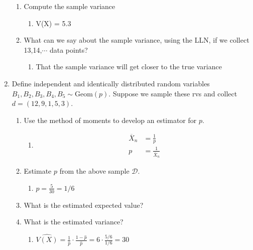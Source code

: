 \documentclass[krantz1,ChapterTOCs]{krantz}
\begin{document}
\begin{enumerate}
\begin{enumerate}
        \item Compute the sample variance
        \begin{enumerate}
            \item { \color{red} V(X) = 5.3  } 
        \end{enumerate}
 
        \item What can we say about the sample variance, using the LLN, if we collect 13,14,$\cdots$ data points?
        \begin{enumerate}
            \item { \color{red} That the sample variance will get closer to the true variance } 
        \end{enumerate}
    \end{enumerate}
    
    \item Define independent and identically distributed random variables $B_{1},B_{2},B_{3},B_{4},B_{5} \sim \text{Geom}(p)$. Suppose we sample these rvs and collect $d = (12,9,1,5,3)$.
    \begin{enumerate}
        \item Use the method of moments to develop an estimator for $p$.
        \begin{enumerate}
            \item { \color{red} 
            \begin{align}
              \overline{X}_{n}  &= \frac{1}{p} \\
              p &= \frac{1}{\overline{X}_{n}} 
            \end{align}
             } 
        \end{enumerate}
        
        \item Estimate $p$ from the above sample $\mathcal{D}$.
        \begin{enumerate}
            \item {\color{red} $p = \frac{5}{30} = 1/6 $  }
        \end{enumerate}
        
        \item What is the estimated expected value? 
        \begin{enumerate}
            \item {\color{red} $\hat{\mathbb{E}(X)} = \frac{1}{1/6} = 6  $
        \end{enumerate}
        
        
        \item What is the estimated variance? 
        \begin{enumerate}
            \item {\color{red} $\hat{V(X)} = \frac{1}{\hat{p}} \cdot \frac{1-\hat{p}}{\hat{p}} = 6 \cdot \frac{5/6}{1/6} = 30   $   }
        \end{enumerate}
        

\end{enumerate}
\end{enumerate}
\end{document}
